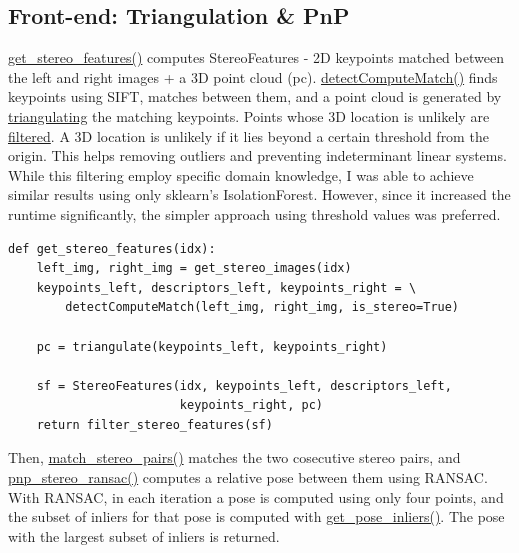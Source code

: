 \documentclass[12pt]{article}
\begin{document}
\subsection{Front-end: Triangulation \& PnP}
\href{https://github.com/ehud-gordon/VAN_ex/blob/master/src/stereo_slam.py#L87}{get_stereo_features()} computes StereoFeatures - 2D keypoints matched between the left and right images + a 3D point cloud (pc). \href{https://github.com/ehud-gordon/VAN_ex/blob/master/src/features/features2d.py#L106}{detectComputeMatch()} finds keypoints using SIFT, matches between them, and a point cloud is generated by \href{https://github.com/ehud-gordon/VAN_ex/blob/master/src/calib3d/triangulate.py#L15}{triangulating} the matching keypoints. Points whose 3D location is unlikely are \href{https://github.com/ehud-gordon/VAN_ex/blob/master/src/utils/slam_utils.py#L36}{filtered}. A 3D location is unlikely if it lies beyond a certain threshold from the origin. This helps removing outliers and preventing indeterminant linear systems. While this filtering employ specific domain knowledge, I was able to achieve similar results using only sklearn's IsolationForest. However, since it increased the runtime significantly, the simpler approach using threshold values was preferred.
\begin{tcolorbox}
\begin{verbatim}  
def get_stereo_features(idx):
    left_img, right_img = get_stereo_images(idx)
    keypoints_left, descriptors_left, keypoints_right = \
        detectComputeMatch(left_img, right_img, is_stereo=True)
    
    pc = triangulate(keypoints_left, keypoints_right)
    
    sf = StereoFeatures(idx, keypoints_left, descriptors_left,
                        keypoints_right, pc)
    return filter_stereo_features(sf)
\end{verbatim}
\end{tcolorbox}
Then, \href{https://github.com/ehud-gordon/VAN_ex/blob/master/src/features/features_stereo.py#L57}{match_stereo_pairs()} matches the two cosecutive stereo pairs, and \href{https://github.com/ehud-gordon/VAN_ex/blob/master/src/calib3d/pnp.py#L32}{pnp_stereo_ransac()} computes a relative pose between them using RANSAC. With RANSAC, in each iteration a pose is computed using only four points, and the subset of inliers for that pose is computed with \href{https://github.com/ehud-gordon/VAN_ex/blob/master/src/calib3d/pnp.py#L125}{get_pose_inliers()}. The pose with the largest subset of inliers is returned. \\ 
\end{document}
